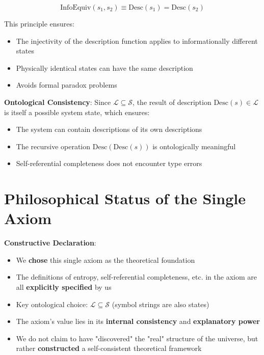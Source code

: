 \begin{equation}
\text{InfoEquiv}(s_1, s_2) \equiv \text{Desc}(s_1) = \text{Desc}(s_2)
\end{equation}

This principle ensures:
\begin{itemize}
\item The injectivity of the description function applies to informationally different states
\item Physically identical states can have the same description
\item Avoids formal paradox problems
\end{itemize}

\textbf{Ontological Consistency}: Since $\mathcal{L} \subseteq \mathcal{S}$, the result of description $\text{Desc}(s) \in \mathcal{L}$ is itself a possible system state, which ensures:
\begin{itemize}
\item The system can contain descriptions of its own descriptions
\item The recursive operation $\text{Desc}(\text{Desc}(s))$ is ontologically meaningful
\item Self-referential completeness does not encounter type errors
\end{itemize}

\section{Philosophical Status of the Single Axiom}
\label{sec:ch01_axiom_and_derivation:philosophical-status-of-the-single-axiom}

\textbf{Constructive Declaration}:
\begin{itemize}
\item We \textbf{chose} this single axiom as the theoretical foundation
\item The definitions of entropy, self-referential completeness, etc. in the axiom are all \textbf{explicitly specified} by us
\item Key ontological choice: $\mathcal{L} \subseteq \mathcal{S}$ (symbol strings are also states)
\item The axiom's value lies in its \textbf{internal consistency} and \textbf{explanatory power}
\item We do not claim to have "discovered" the "real" structure of the universe, but rather \textbf{constructed} a self-consistent theoretical framework
\end{itemize}

